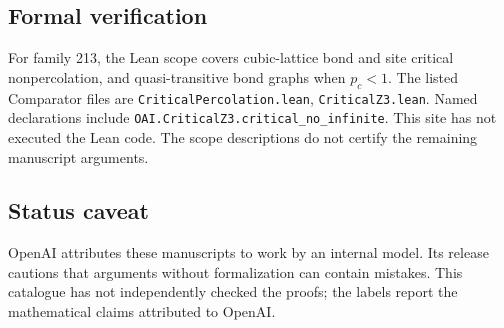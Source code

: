 \documentclass[11pt]{article}
\begin{document}
\subsection{Formal verification}
For family 213, the Lean scope covers cubic-lattice bond and site critical nonpercolation, and quasi-transitive bond graphs when $p_c<1$. The listed Comparator files are \texttt{CriticalPercolation.lean}, \texttt{CriticalZ3.lean}. Named declarations include \texttt{OAI.CriticalZ3.critical\_no\_infinite}. This site has not executed the Lean code. The scope descriptions do not certify the remaining manuscript arguments.

\subsection{Status caveat}
OpenAI attributes these manuscripts to work by an internal model. Its release cautions that arguments without formalization can contain mistakes. This catalogue has not independently checked the proofs; the labels report the mathematical claims attributed to OpenAI.
\end{document}
